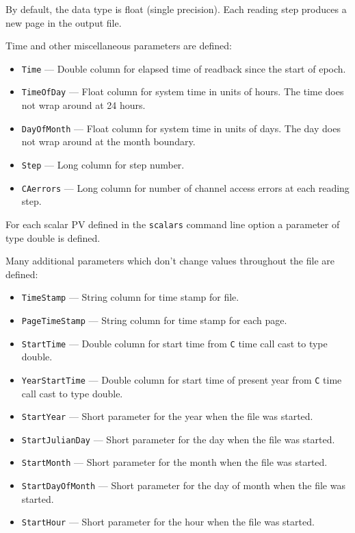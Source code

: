 \begin{itemize}
\begin{itemize}
By default, the data type is float (single precision). Each reading step produces a new page in the output file.

Time and other miscellaneous parameters are defined: 
\begin{itemize}
        \item {\tt Time} --- Double column for elapsed time of readback since the start of epoch.
        \item {\tt TimeOfDay} --- Float column for system time in units of hours. The time does not wrap around at 24 hours.
        \item {\tt DayOfMonth} --- Float column for system time in units of days. The day does not wrap around at the month boundary.
        \item {\tt Step} --- Long column for step number.
        \item {\tt CAerrors} --- Long column for number of channel access errors at each reading step. 
\end{itemize}

For each scalar PV defined in the \verb+scalars+ command line option a parameter of type double is defined.

Many additional parameters which don't change values throughout the file are defined:
\begin{itemize}
        \item {\tt TimeStamp} --- String column for time stamp for file.
        \item {\tt PageTimeStamp} --- String column for time stamp for each page.
        \item {\tt StartTime} --- Double column for start time from {\tt C} time call cast to type double.
        \item {\tt YearStartTime} --- Double column for start time of present year from {\tt C}
                time call cast to type double.
        \item {\verb+StartYear+} --- Short parameter for the year when the file was started.
        \item {\verb+StartJulianDay+} --- Short parameter for the day when the file was started.
        \item {\verb+StartMonth+} --- Short parameter for the month when the file was started.
        \item {\verb+StartDayOfMonth+} --- Short parameter for the day of month when the file was started.
        \item {\verb+StartHour+} --- Short parameter for the hour when the file was started.
\end{itemize}
\end{itemize}


\end{itemize}
